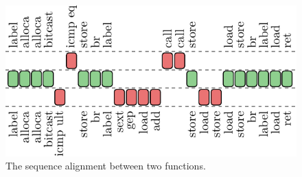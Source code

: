 \begin{figure}[h]
  \centering
  \includegraphics[width=0.85\linewidth]{figs/opcode-align.pdf}
  \caption{The sequence alignment between two functions.}
  \label{fig:opcode-align}
\end{figure}

